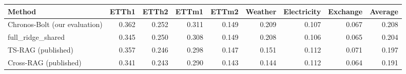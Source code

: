 \begin{tabular}{lrrrrrrrr}
\toprule
Method & ETTh1 & ETTh2 & ETTm1 & ETTm2 & Weather & Electricity & Exchange & Average \\
\midrule
Chronos-Bolt (our evaluation) & 0.362 & 0.252 & 0.311 & 0.149 & 0.209 & 0.107 & 0.067 & 0.208 \\
full\_ridge\_shared & 0.345 & 0.250 & 0.308 & 0.149 & 0.208 & 0.106 & 0.065 & 0.204 \\
TS-RAG (published) & 0.357 & 0.246 & 0.298 & 0.147 & 0.151 & 0.112 & 0.071 & 0.197 \\
Cross-RAG (published) & 0.341 & 0.243 & 0.290 & 0.143 & 0.144 & 0.112 & 0.064 & 0.191 \\
\bottomrule
\end{tabular}
